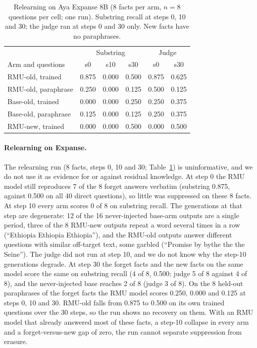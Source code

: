 \documentclass[10pt,twocolumn]{article}
\begin{document}
\begin{table}[tbp]
\centering\footnotesize
\setlength{\tabcolsep}{3pt}
\begin{tabular}{@{}lccc|cc@{}}
\toprule
& \multicolumn{3}{c|}{Substring} & \multicolumn{2}{c}{Judge}\\
Arm and questions & s0 & s10 & s30 & s0 & s30\\
\midrule
RMU-old, trained   & 0.875 & 0.000 & 0.500 & 0.875 & 0.625\\
RMU-old, paraphrase & 0.250 & 0.000 & 0.125 & 0.500 & 0.125\\
Base-old, trained  & 0.000 & 0.000 & 0.250 & 0.250 & 0.375\\
Base-old, paraphrase & 0.125 & 0.000 & 0.125 & 0.250 & 0.375\\
RMU-new, trained   & 0.000 & 0.000 & 0.500 & 0.000 & 0.500\\
\bottomrule
\end{tabular}
\caption{Relearning on Aya Expanse 8B (8 facts per arm, $n=8$ questions per cell; one run). Substring recall at steps 0, 10 and 30; the judge ran at steps 0 and 30 only. New facts have no paraphrases.}
\label{tab:expanse-relearn}
\end{table}

\paragraph{Relearning on Expanse.} The relearning run (8 facts, steps 0, 10 and 30; Table~\ref{tab:expanse-relearn}) is uninformative, and we do not use it as evidence for or against residual knowledge. At step 0 the RMU model still reproduces 7 of the 8 forget answers verbatim (substring 0.875, against 0.500 on all 40 direct questions), so little was suppressed on these 8 facts. At step 10 every arm scores 0 of 8 on substring recall. The generations at that step are degenerate: 12 of the 16 never-injected base-arm outputs are a single period, three of the 8 RMU-new outputs repeat a word several times in a row (``Ethiopia Ethiopia Ethiopia''), and the RMU-old outputs answer different questions with similar off-target text, some garbled (``Promise by bythe the the Seine''). The judge did not run at step 10, and we do not know why the step-10 generations degrade. At step 30 the forget facts and the new facts on the same model score the same on substring recall (4 of 8, 0.500; judge 5 of 8 against 4 of 8), and the never-injected base reaches 2 of 8 (judge 3 of 8). On the 8 held-out paraphrases of the forget facts the RMU model scores 0.250, 0.000 and 0.125 at steps 0, 10 and 30. RMU-old falls from 0.875 to 0.500 on its own trained questions over the 30 steps, so the run shows no recovery on them. With an RMU model that already answered most of these facts, a step-10 collapse in every arm and a forget-versus-new gap of zero, the run cannot separate suppression from erasure.
\end{document}
